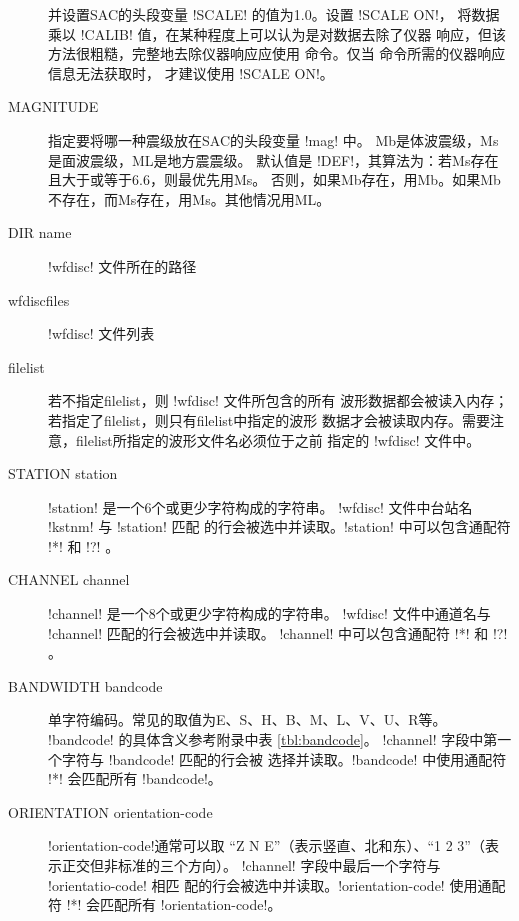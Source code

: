 \begin{description}
    并设置SAC的头段变量 !SCALE! 的值为1.0。设置 !SCALE ON!，
    将数据乘以 !CALIB! 值，在某种程度上可以认为是对数据去除了仪器
    响应，但该方法很粗糙，完整地去除仪器响应应使用 
    命令。仅当  命令所需的仪器响应信息无法获取时，
    才建议使用 !SCALE ON!。
\item [MAGNITUDE] 指定要将哪一种震级放在SAC的头段变量 !mag! 中。
    Mb是体波震级，Ms是面波震级，ML是地方震震级。
    默认值是 !DEF!，其算法为：若Ms存在且大于或等于6.6，则最优先用Ms。
    否则，如果Mb存在，用Mb。如果Mb不存在，而Ms存在，用Ms。其他情况用ML。
\item [DIR name] !wfdisc! 文件所在的路径
\item [wfdiscfiles] !wfdisc! 文件列表
\item [filelist] 若不指定filelist，则 !wfdisc! 文件所包含的所有
    波形数据都会被读入内存；若指定了filelist，则只有filelist中指定的波形
    数据才会被读取内存。需要注意，filelist所指定的波形文件名必须位于之前
    指定的 !wfdisc! 文件中。
\item[STATION station] !station! 是一个6个或更少字符构成的字符串。
    !wfdisc! 文件中台站名 !kstnm! 与 !station! 匹配
    的行会被选中并读取。!station! 中可以包含通配符 !*! 和
    !?! 。
\item[CHANNEL channel]  !channel! 是一个8个或更少字符构成的字符串。
    !wfdisc! 文件中通道名与 !channel! 匹配的行会被选中并读取。
    !channel! 中可以包含通配符 !*! 和 !?! 。
\item [BANDWIDTH bandcode] 单字符编码。常见的取值为E、S、H、B、M、L、V、U、R等。
    !bandcode! 的具体含义参考附录中表 \ref{tbl:bandcode}。
    !channel! 字段中第一个字符与 !bandcode! 匹配的行会被
    选择并读取。!bandcode! 中使用通配符 !*! 会匹配所有
    !bandcode!。
\item [ORIENTATION orientation-code] !orientation-code!通常可以取
    ``Z N E''（表示竖直、北和东）、``1 2 3''（表示正交但非标准的三个方向）。
    !channel! 字段中最后一个字符与 !orientatio-code! 相匹
    配的行会被选中并读取。!orientation-code! 使用通配符 !*!
    会匹配所有 !orientation-code!。
\end{description}

